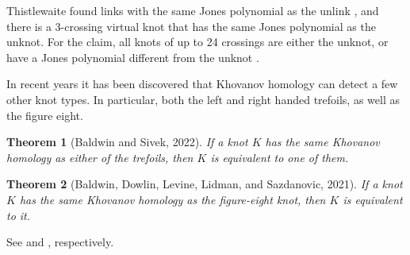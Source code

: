\documentclass{article}
\theoremstyle{plain}
\newtheorem{theorem}{Theorem}
\begin{document}
        Thistlewaite found links with the same Jones polynomial as the unlink
        \cite{Thistlethwaite2001LINKSWT}, and there is a 3-crossing virtual
        knot that has the same Jones polynomial as the unknot. For the claim,
        all knots of up to 24 crossings are either the unknot, or have a
        Jones polynomial different from the unknot
        \cite{VerificationUnknotJonesConjUpTo24}.
        \par\hfill\par
        In recent years it has been discovered that Khovanov homology can detect
        a few other knot types. In particular, both the left and right handed
        trefoils, as well as the figure eight.
        \begin{theorem}[Baldwin and Sivek, 2022]
            If a knot $K$ has the same Khovanov homology as either of the
            trefoils, then $K$ is equivalent to one of them.
        \end{theorem}
        \begin{theorem}[Baldwin, Dowlin, Levine, Lidman, and Sazdanovic, 2021]
            If a knot $K$ has the same Khovanov homology as the figure-eight
            knot, then $K$ is equivalent to it.
        \end{theorem}
        See \cite{BaldwinSivekKhovanovTrefoils} and
        \cite{BaldwinDowlinKhovanovFigureEight}, respectively.
\end{document}
